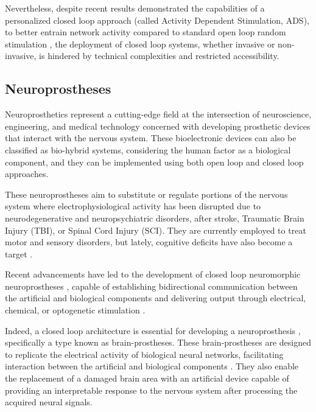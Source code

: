 Nevertheless, despite recent results demonstrated the capabilities of a personalized closed loop approach (called Activity Dependent Stimulation, ADS), to better entrain network activity compared to standard open loop random stimulation \cite{Guggenmos2013,Averna2020,Averna2021}, the deployment of closed loop systems, whether invasive or non-invasive, is hindered by technical complexities and restricted accessibility.
 
\subsection{Neuroprostheses}

Neuroprosthetics represent a cutting-edge field at the intersection of neuroscience, engineering, and medical technology concerned with developing prosthetic devices that interact with the nervous system. 
These bioelectronic devices can also be classified as bio-hybrid systems, considering the human factor as a biological component, and they can be implemented using both open loop and closed loop approaches.

These neuroprostheses aim to substitute or regulate portions of the nervous system where electrophysiological activity has been disrupted due to neurodegenerative and neuropsychiatric disorders, after stroke, Traumatic Brain Injury (TBI), or Spinal Cord Injury (SCI).
They are currently employed to treat motor and sensory disorders, but lately, cognitive deficits have also become a target \cite{Gupta2023}.

Recent advancements have led to the development of closed loop neuromorphic neuroprostheses \cite{Famm2013,Reardon2014}, capable of establishing bidirectional communication between the artificial and biological components \cite{Broccard2017} and delivering output through electrical, chemical, or optogenetic stimulation \cite{Christensen2022}.

Indeed, a closed loop architecture is essential for developing a neuroprosthesis \cite{Levi2018,Buccelli2019}, specifically a type known as brain-prostheses. These brain-prostheses are designed to replicate the electrical activity of biological neural networks, facilitating interaction between the artificial and biological components \cite{Bonifazi2013}. They also enable the replacement of a damaged brain area with an artificial device capable of providing an interpretable response to the nervous system after processing the acquired neural signals.

